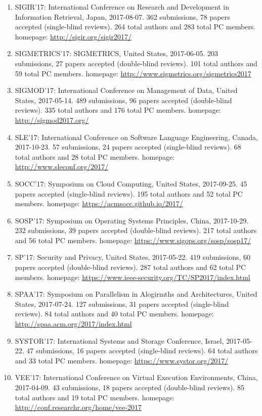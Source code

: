 \documentclass[10pt,letterpaper]{article}
\begin{document}
\begin{enumerate}
\item SIGIR'17: International Conference on Research and Development in Information Retrieval, Japan, 2017-08-07. 362  submissions, 78 papers accepted (single-blind reviews). 264 total authors and 283 total PC members. homepage: \url{http://sigir.org/sigir2017/}
\item SIGMETRICS'17: SIGMETRICS, United States, 2017-06-05. 203  submissions, 27 papers accepted (double-blind reviews). 101 total authors and 59 total PC members. homepage: \url{http://www.sigmetrics.org/sigmetrics2017}
\item SIGMOD'17: International Conference on Management of Data, United States, 2017-05-14. 489  submissions, 96 papers accepted (double-blind reviews). 335 total authors and 176 total PC members. homepage: \url{http://sigmod2017.org/}
\item SLE'17: International Conference on Software Language Engineering, Canada, 2017-10-23. 57  submissions, 24 papers accepted (single-blind reviews). 68 total authors and 28 total PC members. homepage: \url{http://www.sleconf.org/2017/}
\item SOCC'17: Symposium on Cloud Computing, United States, 2017-09-25. 45 papers accepted (single-blind reviews). 195 total authors and 52 total PC members. homepage: \url{https://acmsocc.github.io/2017/}
\item SOSP'17: Symposium on Operating Systems Principles, China, 2017-10-29. 232  submissions, 39 papers accepted (double-blind reviews). 217 total authors and 56 total PC members. homepage: \url{https://www.sigops.org/sosp/sosp17/}
\item SP'17: Security and Privacy, United States, 2017-05-22. 419  submissions, 60 papers accepted (double-blind reviews). 287 total authors and 62 total PC members. homepage: \url{https://www.ieee-security.org/TC/SP2017/index.html}
\item SPAA'17: Symposium on Parallelism in Alogirmths and Architectures, United States, 2017-07-24. 127  submissions, 31 papers accepted (single-blind reviews). 84 total authors and 40 total PC members. homepage: \url{http://spaa.acm.org/2017/index.html}
\item SYSTOR'17: International Systems and Storage Conference, Israel, 2017-05-22. 47  submissions, 16 papers accepted (single-blind reviews). 64 total authors and 33 total PC members. homepage: \url{https://www.systor.org/2017/}
\item VEE'17: International Conference on Virtual Execution Environments, China, 2017-04-09. 43  submissions, 18 papers accepted (double-blind reviews). 85 total authors and 19 total PC members. homepage: \url{http://conf.researchr.org/home/vee-2017}

\end{enumerate}
\end{document}
